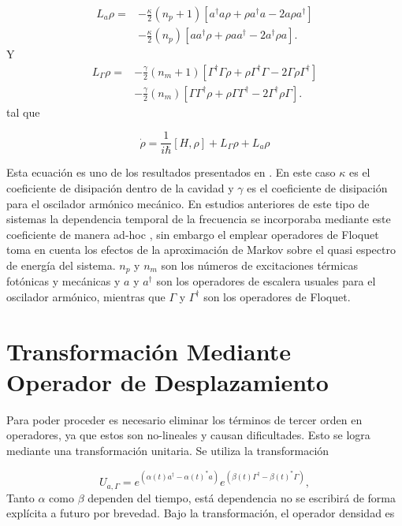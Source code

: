 \documentclass[10pt,a4paper]{report}
\begin{document}
\begin{align}
L_a \rho =& - \frac{\kappa}{2}(n_p + 1)[a^\dagger a\rho + \rho a^\dagger a -2a\rho a^\dagger]  \\
 &- \frac{\kappa}{2}(n_p)[ aa^\dagger\rho + \rho  aa^\dagger -2a^\dagger\rho a].\nonumber
\end{align}
 Y 
\begin{align}
L_\Gamma \rho =& - \frac{\gamma}{2}(n_m + 1)[\Gamma^\dagger \Gamma\rho + \rho \Gamma^\dagger \Gamma -2\Gamma\rho \Gamma^\dagger]  \\
 &- \frac{\gamma}{2}(n_m)[ \Gamma\Gamma^\dagger\rho + \rho  \Gamma\Gamma^\dagger -2\Gamma^\dagger\rho \Gamma].\nonumber
\end{align} tal que


\begin{equation} \label{MasterEquation}
\dot{\rho} = \frac{1}{i\hbar}[H,\rho] + L_\Gamma \rho + L_a \rho
\end{equation} 

Esta ecuación es uno de los resultados presentados en \cite{YanesOC}. En este caso $\kappa$ es el coeficiente de disipación dentro de la cavidad y $\gamma$ es el coeficiente de disipación para el oscilador armónico mecánico. En estudios anteriores de este tipo de sistemas la dependencia temporal de la frecuencia se incorporaba mediante este coeficiente de manera ad-hoc \cite{BarberisLC}, sin embargo el emplear operadores de Floquet toma en cuenta los efectos de la aproximación de Markov sobre el quasi espectro de energía del sistema\cite{HanngiFM}. $n_p$ y $n_m$ son los números de excitaciones térmicas fotónicas y mecánicas y $a$ y $a^\dagger$ son los operadores de escalera usuales para el oscilador armónico, mientras que $\Gamma$ y $\Gamma^\dagger$ son los operadores de Floquet.



\section{Transformación Mediante Operador de Desplazamiento}\label{Desplazamiento}

Para poder proceder es necesario eliminar los términos de tercer orden en operadores, ya que estos son no-lineales y causan dificultades. Esto se logra mediante una transformación unitaria. Se utiliza la transformación

\begin{equation}
U_{a,\Gamma} = e^{(\alpha(t) a^\dagger - \alpha(t)^*a)}e^{(\beta(t) \Gamma^\dagger - \beta(t)^*\Gamma)},
\end{equation} Tanto $\alpha$ como $\beta$ dependen del tiempo, está dependencia no se escribirá de forma explícita a futuro por brevedad. Bajo la transformación, el operador densidad es
\end{document}
